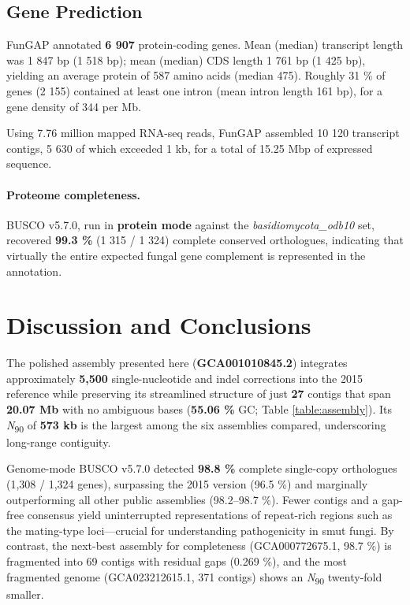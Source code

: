 \documentclass[Journal,letterpaper]{ascelike-new}
\begin{document}
\subsection*{Gene Prediction}

FunGAP annotated \textbf{6 907} protein-coding genes. Mean (median) transcript length was 1 847 bp (1 518 bp); mean (median) CDS length 1 761 bp (1 425 bp), yielding an average protein of 587 amino acids (median 475). Roughly 31 \% of genes (2 155) contained at least one intron (mean intron length 161 bp), for a gene density of 344 per Mb.

Using 7.76 million mapped RNA-seq reads, FunGAP assembled 10 120 transcript contigs, 5 630 of which exceeded 1 kb, for a total of 15.25 Mbp of expressed sequence.

\paragraph{Proteome completeness.} BUSCO v5.7.0, run in \textbf{protein mode} against the \textit{basidiomycota\_odb10} set, recovered \textbf{99.3 \%} (1 315 / 1 324) complete conserved orthologues, indicating that virtually the entire expected fungal gene complement is represented in the annotation.


\section*{Discussion and Conclusions}

The polished assembly presented here (\textbf{GCA001010845.2}) integrates approximately \textbf{5,500} single-nucleotide and indel corrections into the 2015 reference while preserving its streamlined structure of just \textbf{27} contigs that span \textbf{20.07 Mb} with no ambiguous bases (\textbf{55.06 \%} GC; Table \ref{table:assembly}). Its \textit{N}\textsubscript{90} of \textbf{573 kb} is the largest among the six assemblies compared, underscoring long-range contiguity.

Genome-mode BUSCO v5.7.0 detected \textbf{98.8 \%} complete single-copy orthologues (1,308 / 1,324 genes), surpassing the 2015 version (96.5 \%) and marginally outperforming all other public assemblies (98.2–98.7 \%). Fewer contigs and a gap-free consensus yield uninterrupted representations of repeat-rich regions such as the mating-type loci—crucial for understanding pathogenicity in smut fungi. By contrast, the next-best assembly for completeness (GCA000772675.1, 98.7 \%) is fragmented into 69 contigs with residual gaps (0.269 \%), and the most fragmented genome (GCA023212615.1, 371 contigs) shows an \textit{N}\textsubscript{90} twenty-fold smaller.
\end{document}
